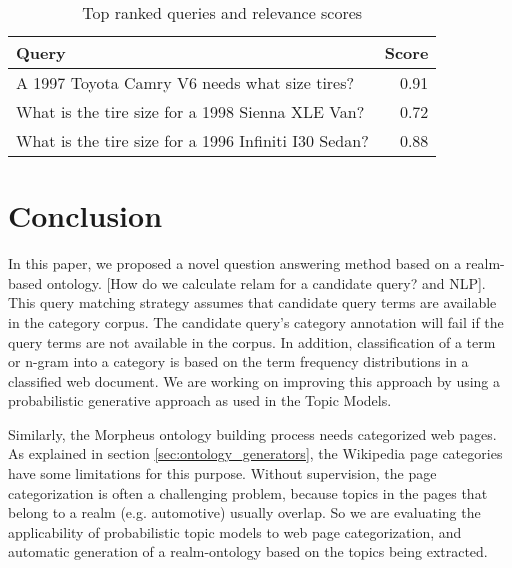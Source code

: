 \begin{table}[h]\footnotesize

\begin{tabular}{l | r}
Query & Score\\
\hline
A 1997 Toyota Camry V6 needs what size tires? & 0.91\\ 
What is the tire size for a 1998 Sienna XLE Van? & 0.72\\ 
What is the tire size for a 1996 Infiniti I30 Sedan? & 0.88\\ 
\hline
\end{tabular}        

\caption{Top ranked queries and relevance scores}
\label{tbl:ranked_queries}   

\end{table}


\section{Conclusion}

In this paper, we proposed a novel question answering method based on a realm-based ontology. [How do we calculate relam for a candidate query? and NLP]. This query matching strategy assumes that candidate query terms are available in the category corpus. The candidate query's category annotation will fail if the
query terms are not available in the corpus. In addition, classification of a term or n-gram into a category is based on the term frequency distributions in a classified web document. We are working on improving this
approach by using a probabilistic generative approach as used in the Topic
Models\cite{Blei2003latentdirichlet}. 

Similarly, the Morpheus ontology building
process needs categorized web pages. As explained in section
\ref{sec:ontology_generators}, the Wikipedia page categories have some
limitations for this purpose. Without supervision, the page categorization is
often a challenging problem, because topics in the pages that belong to a realm
(e.g. automotive) usually overlap. So we are evaluating the applicability of
probabilistic topic models to web page categorization, and automatic
generation of a realm-ontology based on the topics being extracted.            
 


